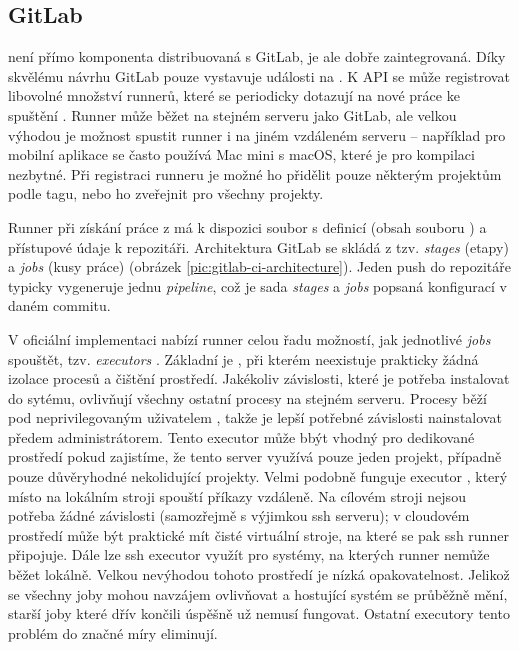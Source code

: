     \subsection{GitLab \CI}
        \CI není přímo komponenta distribuovaná s GitLab, je ale dobře zaintegrovaná. Díky skvělému návrhu GitLab pouze vystavuje události na . K API se může registrovat libovolné množství runnerů, které se periodicky  dotazují na nové práce ke spuštění \cite{gitlab-runner-registration}. Runner může běžet na stejném serveru jako GitLab, ale velkou výhodou je možnost spustit runner i na jiném vzdáleném serveru -- například pro mobilní aplikace se často používá Mac mini s macOS, které je pro kompilaci nezbytné. Při registraci runneru je možné ho přidělit pouze některým projektům podle tagu, nebo ho zveřejnit pro všechny projekty.

        Runner při získání práce z  má k dispozici soubor s definicí (obsah souboru  \cite{gitlab-runner-yaml}) a přístupové údaje k repozitáři. Architektura GitLab \CI se skládá z tzv. \textit{stages} (etapy) a \textit{jobs} (kusy práce) (obrázek \ref{pic:gitlab-ci-architecture}). Jeden push do repozitáře typicky vygeneruje jednu \textit{pipeline}, což je sada \textit{stages} a \textit{jobs} popsaná konfigurací \CI v daném commitu.


        \blind[1]

        V oficiální implementaci nabízí runner celou řadu možností, jak jednotlivé \textit{jobs} spouštět, tzv. \textit{executors} \cite{gitlab-runner-config}. Základní je , při kterém neexistuje prakticky žádná izolace procesů a čištění prostředí. Jakékoliv závislosti, které je potřeba instalovat do sytému, ovlivňují všechny ostatní procesy na stejném serveru. Procesy běží pod neprivilegovaným uživatelem , takže je lepší potřebné závislosti nainstalovat předem administrátorem. Tento executor může bbýt vhodný pro dedikované prostředí pokud zajistíme, že tento server využívá pouze jeden projekt, případně pouze důvěryhodné nekolidující projekty. Velmi podobně funguje executor , který místo na lokálním stroji spouští příkazy vzdáleně. Na cílovém stroji nejsou potřeba žádné závislosti (samozřejmě s výjimkou ssh serveru); v cloudovém prostředí může být praktické mít čisté virtuální stroje, na které se pak ssh runner připojuje. Dále lze ssh executor využít pro systémy, na kterých runner nemůže běžet lokálně. Velkou nevýhodou tohoto prostředí je nízká opakovatelnost. Jelikož se všechny joby mohou navzájem ovlivňovat a hostující systém se průběžně mění, starší joby které dřív končili úspěšně už nemusí fungovat. Ostatní executory tento problém do značné míry eliminují.

